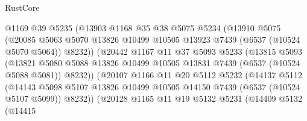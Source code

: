 \begin{lexlean}{RustCore}
\begin{coremodule}
                          @1169
                          @39
                          @5235
                          (@13903
                            @1168
                            @35
                            @38
                            @5075
                            @5234
                            (@13910
                              @5075
                              (@20085
                                @5063
                                @5070
                                @13826
                                @10499
                                @10505
                                @13923
                                @7439
                                (@6537 (@10524 @5070 @5064))
                                @8232))
                            (@20442
                              @1167
                              @11
                              @37
                              @5093
                              @5233
                              (@13815
                                @5093
                                (@13821
                                  @5080
                                  @5088
                                  @13826
                                  @10499
                                  @10505
                                  @13831
                                  @7439
                                  (@6537 (@10524 @5088 @5081))
                                  @8232))
                              (@20107
                                @1166
                                @11
                                @20
                                @5112
                                @5232
                                (@14137
                                  @5112
                                  (@14143
                                    @5098
                                    @5107
                                    @13826
                                    @10499
                                    @10505
                                    @14150
                                    @7439
                                    (@6537 (@10524 @5107 @5099))
                                    @8232))
                                (@20128
                                  @1165
                                  @11
                                  @19
                                  @5132
                                  @5231
                                  (@14409
                                    @5132
                                    (@14415

\end{coremodule}
\end{lexlean}
